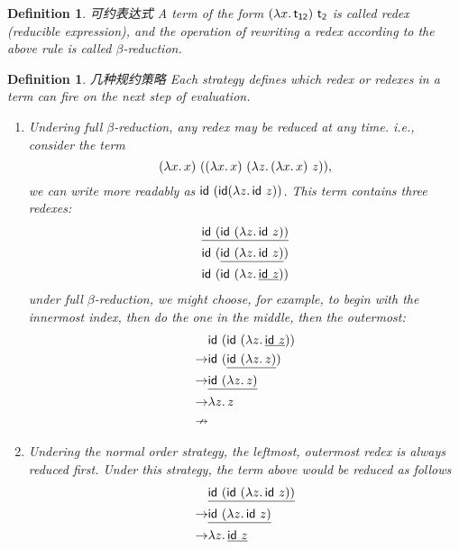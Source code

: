 \documentclass{article}
\theoremstyle{plain}
\newtheorem{definition}[theorem]{Definition}
\theoremstyle{nonumberplain}
\newcommand{\lam}[2]{\ensuremath{\lambda #1\ldotp #2}} %
\newcommand{\term}[1]{\ensuremath\mathsf{#1}}
\begin{document}
\begin{definition}
\rm {\color{red} 可约表达式} A term of the form $(\lam{x}{\term{t_{12}}})~\term{t_2}$ is called {\color{red} redex} (reducible expression), and the operation of rewriting a redex according to the above rule is called {\color{red} $\beta$-reduction}.
\end{definition}

\begin{definition}
\rm {\color{red} 几种规约策略} Each strategy defines which redex or redexes in a term can fire on the next step of evaluation. 
\begin{enumerate}
	\item Undering {\color{red} full $\beta$-reduction}, any redex may be reduced at any time. i.e., consider the term
	$$
	(\lam{x}{x})~((\lam{x}{x})~(\lam{z}{(\lam{x}{x})~z})),
	$$
	we can write more readably as $\term{id}~(\term{id}(\lam{z}{\term{id}}~z))$. This term contains three redexes:
	$$
	\begin{aligned}
	\underline{\term{id}~(\term{id}~(\lam{z}{\term{id}}~z))} \\
	\term{id}~(\underline{\term{id}~(\lam{z}{\term{id}}~z)}) \\
	\term{id}~(\term{id}~(\lam{z}{\underline{\term{id}~z}}))
	\end{aligned}
	$$
	under full $\beta$-reduction, we might choose, for example, to begin with the innermost index, then do the one in the middle, then the outermost:
	$$
	\begin{aligned}
	&\term{id}~(\term{id}~(\lam{z}{\underline{\term{id}~z}})) \\
	\rightarrow & \term{id}~(\underline{\term{id}~(\lam{z}{z})}) \\
	\rightarrow & \underline{\term{id}~(\lam{z}{z})} \\
	\rightarrow & \lam{z}{z} \\
	\nrightarrow
	\end{aligned}
	$$
	\item Undering the {\color{red} normal order} strategy, the leftmost, outermost redex is always reduced first. Under this strategy, the term above would be reduced as follows
	$$
	\begin{aligned}
	& \underline{\term{id}~(\term{id}~(\lam{z}{\term{id}~z}))} \\
	\rightarrow & \underline{\term{id}~(\lam{z}{\term{id}}~z)} \\
	\rightarrow & \lam{z}{\underline{\term{id}~z}} \\

\end{aligned}$$
\end{enumerate}
\end{definition}
\end{document}
